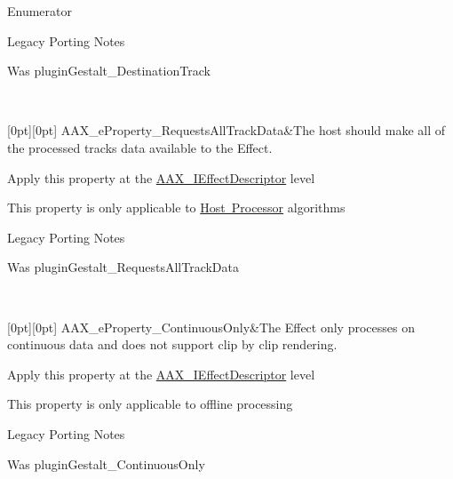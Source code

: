 \begin{DoxyEnumFields}{Enumerator}
\begin{DoxyRefDesc}{Legacy Porting Notes}
\item[\mbox{\hyperlink{a00787__porting_notes000051}{Legacy Porting Notes}}]Was plugin\+Gestalt\+\_\+\+Destination\+Track \end{DoxyRefDesc}
\\
\hline

[0pt][0pt]{}\mbox{\label{a00662_a13e384f22825afd3db6d68395b79ce0daa59caaf3d7c3e195a32b8cb09a9baac2}} 
A\+A\+X\+\_\+e\+Property\+\_\+\+Requests\+All\+Track\+Data&The host should make all of the processed track\textquotesingle{}s data available to the Effect. \begin{DoxyItemize}
\item Apply this property at the \mbox{\hyperlink{a01813}{A\+A\+X\+\_\+\+I\+Effect\+Descriptor}} level \item This property is only applicable to \mbox{\hyperlink{a00804}{Host Processor}} algorithms\end{DoxyItemize}
\begin{DoxyRefDesc}{Legacy Porting Notes}
\item[\mbox{\hyperlink{a00787__porting_notes000052}{Legacy Porting Notes}}]Was plugin\+Gestalt\+\_\+\+Requests\+All\+Track\+Data \end{DoxyRefDesc}
\\
\hline

[0pt][0pt]{}\mbox{\label{a00662_a13e384f22825afd3db6d68395b79ce0da95054276be8782d93437cd74669366d0}} 
A\+A\+X\+\_\+e\+Property\+\_\+\+Continuous\+Only&The Effect only processes on continuous data and does not support \textquotesingle{}clip by clip\textquotesingle{} rendering. \begin{DoxyItemize}
\item Apply this property at the \mbox{\hyperlink{a01813}{A\+A\+X\+\_\+\+I\+Effect\+Descriptor}} level \item This property is only applicable to offline processing\end{DoxyItemize}
\begin{DoxyRefDesc}{Legacy Porting Notes}
\item[\mbox{\hyperlink{a00787__porting_notes000053}{Legacy Porting Notes}}]Was plugin\+Gestalt\+\_\+\+Continuous\+Only \end{DoxyRefDesc}
\\
\hline


\end{DoxyEnumFields}
